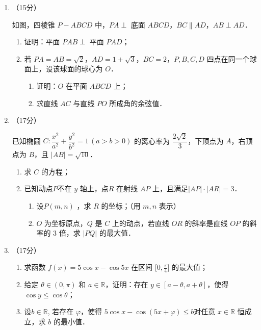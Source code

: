 \begin{description}
\begin{enumerate}[leftmargin=5pt]
        \item （15分）

        如图，四棱锥 $P-ABCD$ 中，$PA\perp$ 底面 $ABCD$，$BC\parallel AD$，$AB\perp AD$．

        \begin{enumerate}[label=(\arabic*)]
            \item 证明：平面 $PAB\perp$ 平面 $PAD$；
            \item 若 $PA=AB=\sqrt{2}$，$AD=1+\sqrt{3}$，$BC=2$，$P,B,C,D$ 四点在同一个球面上，设该球面的球心为 $O$．
            \begin{enumerate}[label=(\roman*)]
                \item 证明：$O$ 在平面 $ABCD$ 上；
                \item 求直线 $AC$ 与直线 $PO$ 所成角的余弦值．
            \end{enumerate}
        \end{enumerate}

        \item （17分）

        已知椭圆 $C:\dfrac{x^2}{a^2}+\dfrac{y^2}{b^2}=1\,(a>b>0)$ 的离心率为 $\dfrac{2\sqrt{2}}{3}$，下顶点为 $A$，右顶点为 $B$，且 $|AB|=\sqrt{10}$．

        \begin{enumerate}[label=(\arabic*)]
            \item 求 $C$ 的方程；
            \item 已知动点\(P\)不在 $y$ 轴上，点$R$ 在射线 $AP$ 上，且满足\(|AP|\cdot|AR|=3\)．
            \begin{enumerate}[label=(\roman*)]
                \item 设$P(m,n)$ ，求 $R$ 的坐标；（用 $m,n$ 表示）
                \item $O$ 为坐标原点，$Q$ 是 $C$ 上的动点，若直线 $OR$ 的斜率是直线 $OP$ 的斜率的 $3$ 倍，求 $|PQ|$ 的最大值．
            \end{enumerate}
        \end{enumerate}

        \item （17分）

        \begin{enumerate}[label=(\arabic*)]
            \item 求函数 $f(x)=5\cos x-\cos5x$ 在区间 $\bigl[0,\frac{\pi}{4}\bigr]$ 的最大值；
            \item 给定 $\theta\in(0,\pi)$ 和 $a\in\mathbb{R}$，证明：存在 $y\in[a-\theta,a+\theta]$，使得 $\cos y\leqslant\cos\theta$；
            \item 设\(b\in\mathbb{R}\), 若存在 $\varphi$，使得 $5\cos x-\cos(5x+\varphi)\leqslant b$对任意 $x\in \mathbb{R}$ 恒成立，求 $b$ 的最小值．
        \end{enumerate}
    \end{enumerate}
\end{description}


